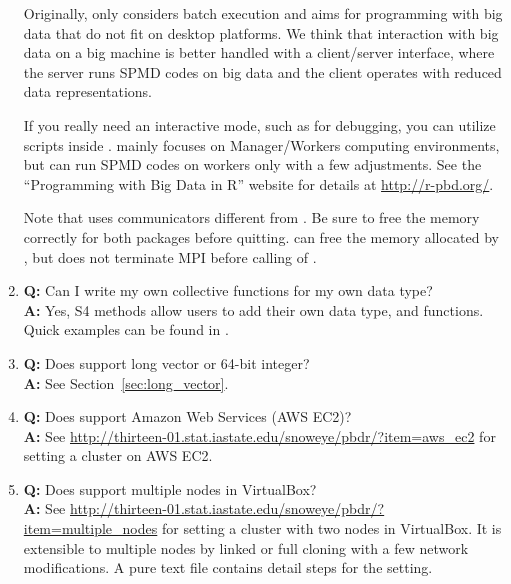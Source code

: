 \begin{enumerate}
      Originally,  only considers batch execution and
      aims for programming with big data that do not fit on desktop
      platforms. We think that interaction with big data on a big
      machine is better handled with a client/server interface, where
      the server runs SPMD codes on big data and the client operates
      with reduced data representations.

      If you really need an interactive mode, such as for debugging,
      you can utilize  scripts inside
      .  mainly focuses on Manager/Workers
      computing environments, but can run SPMD codes on workers only
      with a few adjustments. See the ``Programming with Big Data in R''
      website for details at \url{http://r-pbd.org/}.

      Note that  uses communicators different from
      .  Be sure to free the memory correctly for both
      packages before quitting. 
      can free the memory allocated by , but does not
      terminate MPI before calling  of .

\item {\bf\color{blue} Q:}
      Can I write my own collective functions for my own data type? \\
      {\bf\color{blue} A:}
      Yes, S4 methods allow users to add their own data type, and functions.
      Quick examples can be found in .

\item {\bf\color{blue} Q:}
      Does  support long vector or 64-bit integer? \\
      {\bf\color{blue} A:}
      See Section~\ref{sec:long_vector}.

\item {\bf\color{blue} Q:}
      Does  support Amazon Web Services (AWS EC2)? \\
      {\bf\color{blue} A:}
      See \url{http://thirteen-01.stat.iastate.edu/snoweye/pbdr/?item=aws_ec2}
      for setting a cluster on AWS EC2.

\item {\bf\color{blue} Q:}
      Does  support multiple nodes in VirtualBox? \\
      {\bf\color{blue} A:}
      See \url{http://thirteen-01.stat.iastate.edu/snoweye/pbdr/?item=multiple_nodes}
      for setting a cluster with two nodes in VirtualBox. It is extensible to
      multiple nodes by linked or full cloning with a few network modifications.
      A pure text file  contains detail steps for the
      setting.


\end{enumerate}
